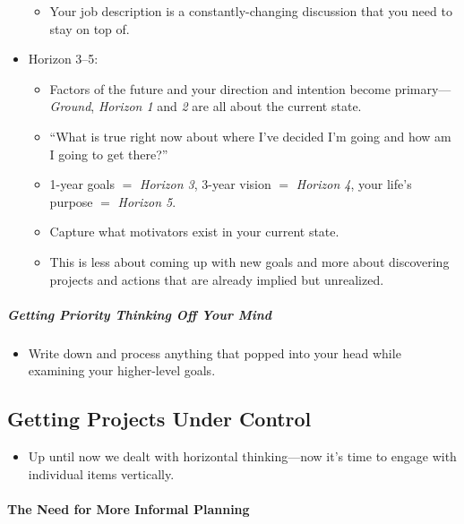 \documentclass{article}
\begin{document}
\begin{itemize}
\begin{itemize}
  \item Your job description is a constantly-changing discussion that you need to stay on top of.
 \end{itemize}
 \item Horizon 3--5:
 \begin{itemize}
  \item Factors of the future and your direction and intention become pri\-mary---\textit{Ground}, \textit{Horizon 1} and \textit{2} are all about the current state.
  \item ``What is true right now about where I've decided I'm going and how am I going to get there?''
  \item 1-year goals $=$ \textit{Horizon 3}, 3-year vision $=$ \textit{Horizon 4}, your life's purpose $=$ \textit{Horizon 5}.
  \item Capture what motivators exist in your current state.
  \item This is less about coming up with new goals and more about discovering projects and actions that are already implied but unrealized.
 \end{itemize}
\end{itemize}

\subparagraph{Getting Priority Thinking Off Your Mind}

\begin{itemize}
 \item Write down and process anything that popped into your head while examining your higher-level goals.
\end{itemize}

\subsection{Getting Projects Under Control}

\begin{itemize}
 \item Up until now we dealt with horizontal thinking---now it's time to engage with individual items vertically.
\end{itemize}

\paragraph{The Need for More Informal Planning}
\end{document}
